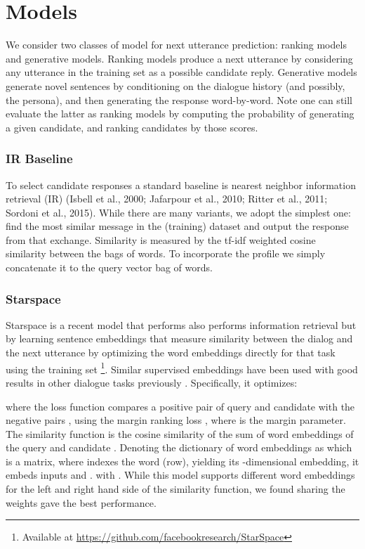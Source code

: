 \documentclass[11pt,a4paper]{article}
\begin{document}
\section{Models}

We consider two classes of model for next utterance prediction: ranking models and generative models.
Ranking models produce a next utterance by considering any utterance in the training set as a possible candidate reply. Generative models 
 generate novel sentences by conditioning on the dialogue history (and possibly, the persona), and then generating the response word-by-word. Note one can still evaluate the latter as ranking models by computing the probability of generating a given candidate, and ranking candidates by those scores.







\ifarxiv
\subsubsection{IR Baseline}
To select candidate responses a standard baseline is nearest neighbor information retrieval (IR) (Isbell et al., 2000; Jafarpour et al., 2010; Ritter et al., 2011; Sordoni et al., 2015). 
While there are many variants, we adopt the simplest one: find the most similar message in the (training) dataset and output the response from that exchange. Similarity is measured by the tf-idf weighted cosine similarity between the bags of words. To incorporate the profile we simply concatenate it to the query vector bag of words. 


\subsubsection{Starspace}

Starspace is a recent model that performs also performs information retrieval but by learning sentence embeddings that measure similarity between the dialog and the next utterance by optimizing the word embeddings directly for that task using the training set \citep{wu2017starspace}\footnote{Available at \url{https://github.com/facebookresearch/StarSpace}}. Similar supervised embeddings have been used with good results in other dialogue tasks previously \citep{dodge2015evaluating}. 
Specifically, it optimizes:

where the loss function  compares a positive pair of query and candidate  with the negative pairs ,  using the margin ranking loss , where  is the margin parameter. The similarity function  is the cosine similarity of the sum of word embeddings of the query  and candidate . Denoting the dictionary of  word embeddings as  which is a  matrix, where  indexes the  word (row), yielding its -dimensional embedding, it embeds inputs  and . 
  with . While this model supports different word embeddings for the left and right hand side of the similarity function, we found sharing the weights gave the best performance.
  
\end{document}
